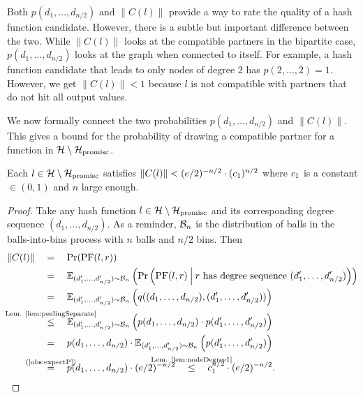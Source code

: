 \documentclass[a4paper,USenglish,cleveref]{lipics-v2021}
\def\refRelLem#1#2{\stackrel{\mathclap{\text{Lem. \ref{#1}}}}{#2}\quad}
\def\refRelEq#1#2{\stackrel{\mathclap{\text{(\ref{#1})}}}{#2}\quad}
\def\cond{\hspace{0.8mm}\middle\vert\hspace{0.8mm}}
\begin{document}
Both $p(d_1,\ldots,d_{n/2})$ and $\|C(l)\|$ provide a way to rate the quality of a hash function candidate.
However, there is a subtle but important difference between the two.
While $\|C(l)\|$ looks at the compatible partners in the bipartite case, $p(d_1,\ldots,d_{n/2})$ looks at the graph when connected to itself.
For example, a hash function candidate that leads to only nodes of degree $2$ has $p(2,\ldots,2) = 1$.
However, we get $\|C(l)\| < 1$ because $l$ is not compatible with partners that do not hit all output values.

We now formally connect the two probabilities $p(d_1,\ldots,d_{n/2})$ and $\|C(l)\|$.
This gives a bound for the probability of drawing a compatible partner for a function in $\mathcal{H}\setminus\mathcal{H}_{\textrm{promisc}}$.

\begin{lemma}
  Each $l \in \mathcal{H}\setminus\mathcal{H}_{\textrm{promisc}}$ satisfies $\|C(l)\| < (e/2)^{-n/2} \cdot (c_1)^{n/2}$ where $c_1$ is a constant $\in (0, 1)$ and $n$ large enough.
  \label{lem:maxC}
\end{lemma}
\begin{proof}
  Take any hash function $l \in \mathcal{H}\setminus\mathcal{H}_{\textrm{promisc}}$ and its corresponding degree sequence $(d_1, \ldots, d_{n/2})$.
  As a reminder, $\mathcal{B}_n$ is the distribution of balls in the balls-into-bins process with $n$ balls and $n/2$ bins.
  Then
  \begin{align*}
    \|C(l)\| \quad
      &=\quad \Pr(\PF(l, r))\\
      &=\quad \expect_{(d'_1, \ldots, d'_{n/2}) \sim \B_n}\left(\Pr\left(\PF(l, r) \cond r \textrm{ has degree sequence } (d'_1, \ldots, d'_{n/2})\right)\right)\\
      &=\quad \expect_{(d'_1, \ldots, d'_{n/2}) \sim \B_n}\left(q((d_1, \ldots, d_{n/2}), (d'_1, \ldots, d'_{n/2}))\right)\\
      &\refRelLem{lem:peelingSeparate}{\leq} \expect_{(d'_1, \ldots, d'_{n/2}) \sim \B_n}\left(p(d_1, \ldots, d_{n/2}) \cdot p(d'_1, \ldots, d'_{n/2})\right)\\
      &=\quad p(d_1, \ldots, d_{n/2}) \cdot \expect_{(d'_1, \ldots, d'_{n/2}) \sim \B_n}\left(p(d'_1, \ldots, d'_{n/2})\right)\\
      &\refRelEq{obs:expectP}{=} p(d_1, \ldots, d_{n/2}) \cdot (e/2)^{-n/2}
      \quad\refRelLem{lem:nodeDegree1}{\leq} \constantMaxC^{n/2} \cdot (e/2)^{-n/2}.
    \tag*{\qedhere}
  \end{align*}
\end{proof}
\end{document}
